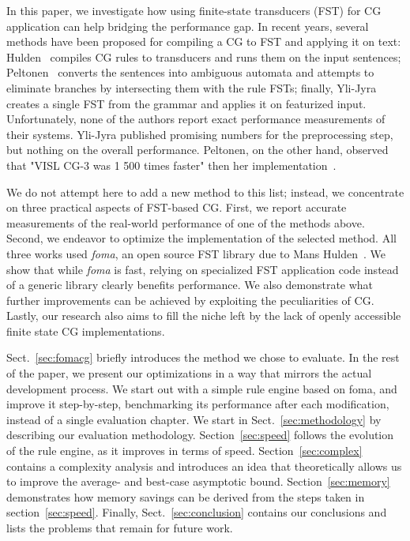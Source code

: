 \documentclass[11pt]{article}
\begin{document}
In this paper, we investigate how using finite-state transducers (FST) for CG
application can help bridging the performance gap. In recent years, several
methods have been proposed for compiling a CG to FST and applying it on text:
Hulden~ compiles CG rules to transducers and runs them on the
input sentences; Peltonen~ converts the sentences into ambiguous
automata and attempts to eliminate branches by intersecting them with the rule
FSTs; finally, Yli-Jyra~ creates a single FST from the
grammar and applies it on featurized input. Unfortunately, none of the authors
report exact performance measurements of their systems. Yli-Jyra published
promising numbers for the preprocessing step, but nothing on the overall
performance. Peltonen, on the other hand, observed that "VISL CG-3 was 1 500
times faster" then her implementation~\cite{Peltonen:2011}.

We do not attempt here to add a new method to this list; instead, we
concentrate on three practical aspects of FST-based CG. First, we report accurate
measurements of the real-world performance of one of the methods above. Second,
we endeavor to optimize the implementation of the selected method. All three
works used \emph{foma}, an open source FST library due to Mans
Hulden~. We show that while \emph{foma} is fast,
relying on specialized FST application code instead of a generic library
clearly benefits performance. We also demonstrate what further improvements can
be achieved by exploiting the peculiarities of CG. Lastly, our research also
aims to fill the niche left by the lack of openly accessible finite state CG
implementations.

Sect.~\ref{sec:fomacg} briefly introduces the method we chose to evaluate.
In the rest of the paper, we present our optimizations in a way that mirrors the
actual development process. We start out with a simple rule engine based on
foma, and improve it step-by-step, benchmarking its performance after each
modification, instead of a single evaluation chapter. We start in
Sect.~\ref{sec:methodology} by describing our evaluation methodology.
Section~\ref{sec:speed} follows the evolution of the rule engine, as it improves
in terms of speed. Section~\ref{sec:complex} contains a complexity analysis
and introduces an idea that theoretically allows us to improve the average- and
best-case asymptotic bound.
Section~\ref{sec:memory} demonstrates how memory savings can be derived from the
steps taken in section~\ref{sec:speed}. Finally, Sect.~\ref{sec:conclusion}
contains our conclusions and lists the problems that remain for future work.
\end{document}
